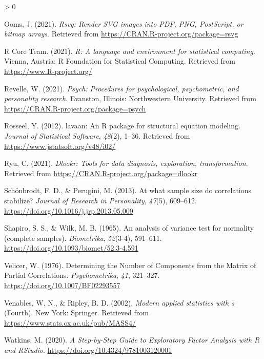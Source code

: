 \documentclass[
  english,
  man]{apa6}
\newlength{\cslhangindent}
\newenvironment{CSLReferences}[2] %
 {%
  \setlength{\parindent}{0pt}
  \ifodd #1 \everypar{\setlength{\hangindent}{\cslhangindent}}\ignorespaces\fi
  \ifnum #2 > 0
  \setlength{\parskip}{#2\baselineskip}
  \fi
 }%
 {}
\begin{document}
\begin{CSLReferences}{1}{0}
\leavevmode\hypertarget{ref-R-rsvg}{}%
Ooms, J. (2021). \emph{Rsvg: Render SVG images into PDF, PNG, PostScript, or bitmap arrays}. Retrieved from \url{https://CRAN.R-project.org/package=rsvg}

\leavevmode\hypertarget{ref-R-base}{}%
R Core Team. (2021). \emph{R: A language and environment for statistical computing}. Vienna, Austria: R Foundation for Statistical Computing. Retrieved from \url{https://www.R-project.org/}

\leavevmode\hypertarget{ref-R-psych}{}%
Revelle, W. (2021). \emph{Psych: Procedures for psychological, psychometric, and personality research}. Evanston, Illinois: Northwestern University. Retrieved from \url{https://CRAN.R-project.org/package=psych}

\leavevmode\hypertarget{ref-R-lavaan}{}%
Rosseel, Y. (2012). {lavaan}: An {R} package for structural equation modeling. \emph{Journal of Statistical Software}, \emph{48}(2), 1--36. Retrieved from \url{https://www.jstatsoft.org/v48/i02/}

\leavevmode\hypertarget{ref-R-dlookr}{}%
Ryu, C. (2021). \emph{Dlookr: Tools for data diagnosis, exploration, transformation}. Retrieved from \url{https://CRAN.R-project.org/package=dlookr}

\leavevmode\hypertarget{ref-schonbrodtWhatSampleSize2013}{}%
Schönbrodt, F. D., \& Perugini, M. (2013). At what sample size do correlations stabilize? \emph{Journal of Research in Personality}, \emph{47}(5), 609--612. \url{https://doi.org/10.1016/j.jrp.2013.05.009}

\leavevmode\hypertarget{ref-shapiroAnalysisVarianceTest1965}{}%
Shapiro, S. S., \& Wilk, M. B. (1965). An analysis of variance test for normality (complete samples). \emph{Biometrika}, \emph{52}(3-4), 591--611. \url{https://doi.org/10.1093/biomet/52.3-4.591}

\leavevmode\hypertarget{ref-velicerDeterminingNumberComponents1976}{}%
Velicer, W. (1976). Determining the {Number} of {Components} from the {Matrix} of {Partial Correlations}. \emph{Psychometrika}, \emph{41}, 321--327. \url{https://doi.org/10.1007/BF02293557}

\leavevmode\hypertarget{ref-R-MASS}{}%
Venables, W. N., \& Ripley, B. D. (2002). \emph{Modern applied statistics with s} (Fourth). New York: Springer. Retrieved from \url{https://www.stats.ox.ac.uk/pub/MASS4/}

\leavevmode\hypertarget{ref-watkinsStepbyStepGuideExploratory2020}{}%
Watkins, M. (2020). \emph{A {Step}-by-{Step Guide} to {Exploratory Factor Analysis} with {R} and {RStudio}}. \url{https://doi.org/10.4324/9781003120001}


\end{CSLReferences}
\end{document}
